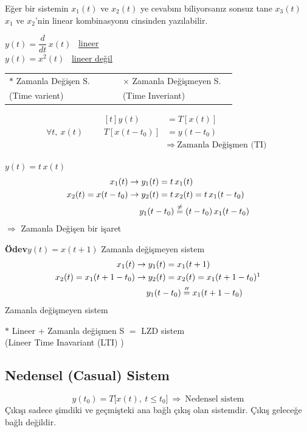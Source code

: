 \documentclass[11pt,a4paper]{article}
\begin{document}
Eğer bir sistemin $x_1(t)$ ve $x_2(t)$ ye cevabını biliyorsanız sonsuz tane $x_3(t)$ $x_1$ ve $x_2$'nin linear kombinasyonu cinsinden yazılabilir.

\medskip
\noindent $y(t)=\dfrac{d}{dt}\,x(t)$ \ \underline{lineer} \\[1mm]
$y(t)=x^2(t)$ \ \underline{lineer değil}

\medskip
\noindent
\begin{tabular}{@{}p{0.47\linewidth}p{0.47\linewidth}@{}}
  \textcolor{kirmizikalem}{$\ast$} Zamanla Değişen S. & $\times$ Zamanla Değişmeyen S. \\
  \quad (Time varient) & \quad (Time Inveriant)
\end{tabular}

\[ \forall t,\ x(t)\qquad\begin{aligned}[t] y(t)&=T[x(t)] \\ T[x(t-t_0)]&=y(t-t_0) \\ &\Rightarrow\ \text{Zamanla Değişmen (TI)}\end{aligned} \]

\begin{ornek}
  $y(t)=t\,x(t)$
  \begin{align*}
    x_1(t) &\to y_1(t)=t\,x_1(t) \\
    x_2(t)=x(t-t_0) &\to y_2(t)=t\,x_2(t)=t\,x_1(t-t_0) \\
    &\hphantom{\to\ }y_1(t-t_0)\overset{\neq}{=}(t-t_0)\,x_1(t-t_0)
  \end{align*}
  $\Rightarrow$ Zamanla Değişen bir işaret
\end{ornek}

\noindent\textbf{Ödev}\quad $y(t)=x(t+1)$ \qquad\qquad Zamanla değişmeyen sistem
\begin{align*}
x_1(t) &\to y_1(t)=x_1(t+1) \\
x_2(t)=x_1(t+1-t_0) &\to y_2(t)=x_2(t)=x_1(t+1-t_0)\footnotemark \\
&\hphantom{\to\ }y_1(t-t_0)\overset{\prime\prime}{=}x_1(t+1-t_0)
\end{align*}
Zamanla değişmeyen sistem

\medskip
\noindent\textcolor{kirmizikalem}{$\ast$} Lineer + Zamanla değişmen S $=$ LZD sistem \\
(Lineer Time Inavariant (LTI) )

\subsection{Nedensel (Casual) Sistem}
\[ y(t_0)=T\bigl[x(t),\ t\le t_0\bigr]\ \Rightarrow\ \text{Nedensel sistem} \]
Çıkışı sadece şimdiki ve geçmişteki ana bağlı çıkış olan sistemdir. Çıkış geleceğe bağlı değildir.
\end{document}

